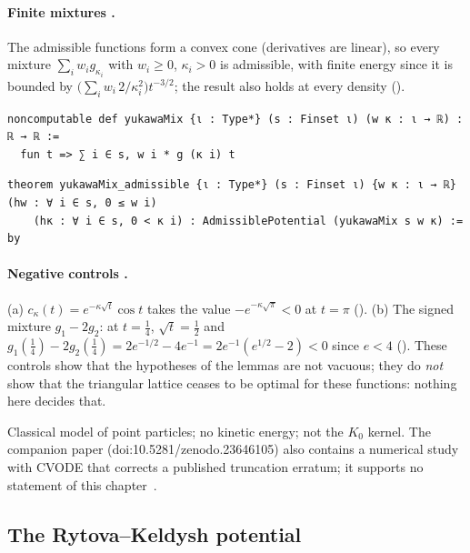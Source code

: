 \paragraph{Finite mixtures \tierA.} The admissible functions form a convex cone (derivatives are linear), so every
mixture $\sum_iw_ig_{\kappa_i}$ with $w_i\ge0$, $\kappa_i>0$ is admissible, with finite energy since it is bounded by
$\bigl(\sum_iw_i\,2/\kappa_i^2\bigr)t^{-3/2}$; the result also holds at every density ().
\begin{leanbox}
\begin{lstlisting}[style=chdeux]
noncomputable def yukawaMix {ι : Type*} (s : Finset ι) (w κ : ι → ℝ) : ℝ → ℝ :=
  fun t => ∑ i ∈ s, w i * g (κ i) t
\end{lstlisting}
\begin{lstlisting}[style=chdeux]
theorem yukawaMix_admissible {ι : Type*} (s : Finset ι) {w κ : ι → ℝ} (hw : ∀ i ∈ s, 0 ≤ w i)
    (hκ : ∀ i ∈ s, 0 < κ i) : AdmissiblePotential (yukawaMix s w κ) := by
\end{lstlisting}
\end{leanbox}

\paragraph{Negative controls \tierA.} (a) $c_\kappa(t)=e^{-\kappa\sqrt t}\cos t$ takes the value
$-e^{-\kappa\sqrt\pi}<0$ at $t=\pi$ (). (b) The signed mixture $g_1-2g_2$: at $t=\frac14$,
$\sqrt t=\frac12$ and $g_1(\tfrac14)-2g_2(\tfrac14)=2e^{-1/2}-4e^{-1}=2e^{-1}(e^{1/2}-2)<0$ since $e<4$
(). These controls show that the hypotheses of the lemmas are not vacuous; they do
\emph{not} show that the triangular lattice ceases to be optimal for these functions: nothing here decides that.

\begin{warnbox}[: scope]
Classical model of point particles; no kinetic energy; not the $K_0$ kernel. The companion paper
(doi\string:10.5281/zenodo.23646105) also contains a \tierX{} numerical study with CVODE that corrects a published
truncation erratum; it supports no statement of this chapter~\cite{ch2yuk}.
\end{warnbox}

\subsection{The Rytova--Keldysh potential}\label{ch2:ssec:kel}

